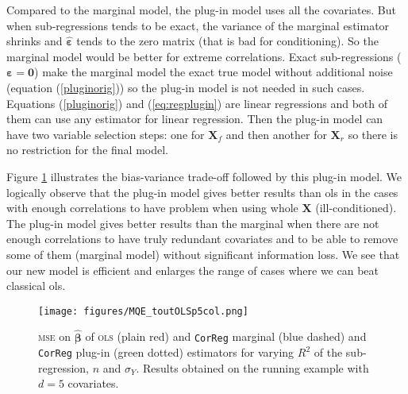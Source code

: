 \documentclass[12pt,a4paper]{report}
\begin{document}
Compared to the marginal model, the plug-in model uses all the covariates. But when sub-regressions tends to be exact, the variance of the marginal estimator shrinks and $ \hat{\boldsymbol{\varepsilon}}$ tends to the zero matrix (that is bad for conditioning). So the marginal model would be better for extreme correlations. 
Exact sub-regressions ($\boldsymbol{\varepsilon}=\boldsymbol{0}$) make the marginal model the exact true model without additional noise (equation (\ref{pluginorig})) so the plug-in model is not needed in such cases.\\
Equations (\ref{pluginorig}) and (\ref{eq:regplugin}) are linear regressions and both of them can use any estimator for linear regression. Then the plug-in model can have two variable selection steps: one for $\boldsymbol{X}_f$ and then another for $\boldsymbol{X}_r$ so there is no restriction for the final model.
%		

	Figure \ref{MQE2} illustrates the bias-variance trade-off followed by this plug-in model. We logically observe that the plug-in model gives better results than {\sc ols} in the cases with enough correlations to have problem when using whole $\boldsymbol{X}$ (ill-conditioned). The plug-in model gives better results than the marginal when there are not enough correlations to have truly redundant covariates and to be able to remove some of them (marginal model) without significant information loss. We see that our new model is efficient and enlarges the range of cases where we can beat classical {\sc ols}.
\begin{figure}[h!]
\centering
	\texttt{[image: figures/MQE\_toutOLSp5col.png]}
	\caption{\textsc{mse} on $\hat{\boldsymbol{\beta}}$ of \textsc{ols} (plain red) and {\tt CorReg} marginal (blue dashed) and {\tt CorReg} plug-in (green dotted) estimators for varying $R^2$ of the sub-regression, $n$ and $\sigma_Y$. Results obtained on the running example with $d=5$ covariates.}\label{MQE2}
\end{figure}	
			
\end{document}
